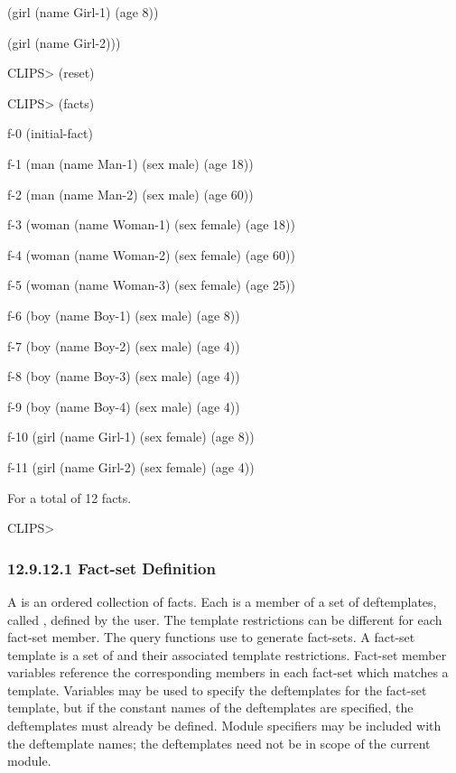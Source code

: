 \documentclass[letterpaper,10pt,english]{sphinxmanual}
\begin{document}
(girl (name Girl-1) (age 8))

(girl (name Girl-2)))

CLIPS\textgreater{} (reset)

CLIPS\textgreater{} (facts)

f-0 (initial-fact)

f-1 (man (name Man-1) (sex male) (age 18))

f-2 (man (name Man-2) (sex male) (age 60))

f-3 (woman (name Woman-1) (sex female) (age 18))

f-4 (woman (name Woman-2) (sex female) (age 60))

f-5 (woman (name Woman-3) (sex female) (age 25))

f-6 (boy (name Boy-1) (sex male) (age 8))

f-7 (boy (name Boy-2) (sex male) (age 4))

f-8 (boy (name Boy-3) (sex male) (age 4))

f-9 (boy (name Boy-4) (sex male) (age 4))

f-10 (girl (name Girl-1) (sex female) (age 8))

f-11 (girl (name Girl-2) (sex female) (age 4))

For a total of 12 facts.

CLIPS\textgreater{}


\subsubsection{12.9.12.1 Fact-set Definition}
\label{\detokenize{actions:fact-set-definition}}
A  is an ordered collection of facts. Each  is a member of a set of deftemplates, called , defined by the user. The template restrictions can be
different for each fact-set member. The query functions use  to generate fact-sets. A fact-set template is a set of
 and their associated template
restrictions. Fact-set member variables reference the corresponding
members in each fact-set which matches a template. Variables may be used
to specify the deftemplates for the fact-set template, but if the
constant names of the deftemplates are specified, the deftemplates must
already be defined. Module specifiers may be included with the
deftemplate names; the deftemplates need not be in scope of the current
module.
\end{document}
